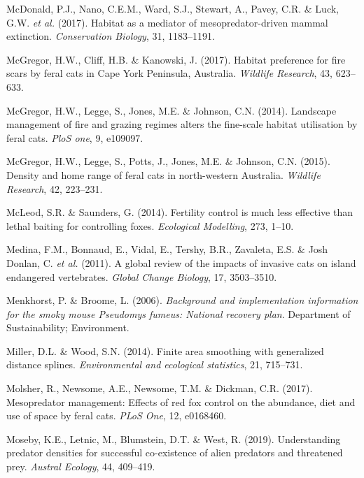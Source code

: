 \documentclass[11pt,a4paper,titlepage,twoside,openright]{style/unimelbthesis}
\begin{document}
\begin{mainmatter}
\leavevmode\hypertarget{ref-mcdonald2017habitat}{}%
McDonald, P.J., Nano, C.E.M., Ward, S.J., Stewart, A., Pavey, C.R. \& Luck, G.W. \emph{et al.} (2017). Habitat as a mediator of mesopredator-driven mammal extinction. \emph{Conservation Biology}, 31, 1183--1191.

\leavevmode\hypertarget{ref-mcgregor2017habitat}{}%
McGregor, H.W., Cliff, H.B. \& Kanowski, J. (2017). Habitat preference for fire scars by feral cats in Cape York Peninsula, Australia. \emph{Wildlife Research}, 43, 623--633.

\leavevmode\hypertarget{ref-mcgregor2014landscape}{}%
McGregor, H.W., Legge, S., Jones, M.E. \& Johnson, C.N. (2014). Landscape management of fire and grazing regimes alters the fine-scale habitat utilisation by feral cats. \emph{PloS one}, 9, e109097.

\leavevmode\hypertarget{ref-mcgregor2015density}{}%
McGregor, H.W., Legge, S., Potts, J., Jones, M.E. \& Johnson, C.N. (2015). Density and home range of feral cats in north-western Australia. \emph{Wildlife Research}, 42, 223--231.

\leavevmode\hypertarget{ref-mcleod2014fertility}{}%
McLeod, S.R. \& Saunders, G. (2014). Fertility control is much less effective than lethal baiting for controlling foxes. \emph{Ecological Modelling}, 273, 1--10.

\leavevmode\hypertarget{ref-medina2011global}{}%
Medina, F.M., Bonnaud, E., Vidal, E., Tershy, B.R., Zavaleta, E.S. \& Josh Donlan, C. \emph{et al.} (2011). A global review of the impacts of invasive cats on island endangered vertebrates. \emph{Global Change Biology}, 17, 3503--3510.

\leavevmode\hypertarget{ref-menkhorst2006background}{}%
Menkhorst, P. \& Broome, L. (2006). \emph{Background and implementation information for the smoky mouse Pseudomys fumeus: National recovery plan}. Department of Sustainability; Environment.

\leavevmode\hypertarget{ref-miller2014finite}{}%
Miller, D.L. \& Wood, S.N. (2014). Finite area smoothing with generalized distance splines. \emph{Environmental and ecological statistics}, 21, 715--731.

\leavevmode\hypertarget{ref-molsher2017mesopredator}{}%
Molsher, R., Newsome, A.E., Newsome, T.M. \& Dickman, C.R. (2017). Mesopredator management: Effects of red fox control on the abundance, diet and use of space by feral cats. \emph{PLoS One}, 12, e0168460.

\leavevmode\hypertarget{ref-moseby2019understanding}{}%
Moseby, K.E., Letnic, M., Blumstein, D.T. \& West, R. (2019). Understanding predator densities for successful co-existence of alien predators and threatened prey. \emph{Austral Ecology}, 44, 409--419.


\end{mainmatter}
\end{document}
